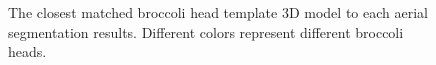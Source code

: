 \begin{figure}[htb!]
  \begin{center}
  \end{center}
  \caption[The closest matched broccoli head template 3D model]{
    The closest matched broccoli head template 3D model to each aerial segmentation results. Different colors represent different broccoli heads.
  }
  \label{fig:xrs4}
\end{figure}